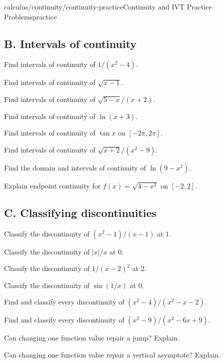 \documentclass[11pt,openany]{book}
\theoremstyle{bgplain}
\begin{document}
\begin{webpage}{calculus/continuity/continuity-practice}{Continuity and IVT Practice Problems}{practice}
\subsection*{B. Intervals of continuity}
\begin{bgexercises}[label=\textbf{5.\arabic*},resume]
  \item Find intervals of continuity of \(1/(x^2-4)\).
  \item Find intervals of continuity of \(\sqrt{x-1}\).
  \item Find intervals of continuity of \(\sqrt{5-x}/(x+2)\).
  \item Find intervals of continuity of \(\ln(x+3)\).
  \item Find intervals of continuity of \(\tan x\) on \([-2\pi,2\pi]\).
  \item Find intervals of continuity of \(\sqrt{x+2}/(x^2-9)\).
  \item Find the domain and intervals of continuity of \(\ln(9-x^2)\).
  \item Explain endpoint continuity for \(f(x)=\sqrt{4-x^2}\) on \([-2,2]\).
\end{bgexercises}

\subsection*{C. Classifying discontinuities}
\begin{bgexercises}[label=\textbf{5.\arabic*},resume]
  \item Classify the discontinuity of \((x^2-1)/(x-1)\) at \(1\).
  \item Classify the discontinuity of \(|x|/x\) at \(0\).
  \item Classify the discontinuity of \(1/(x-2)^2\) at \(2\).
  \item Classify the discontinuity of \(\sin(1/x)\) at \(0\).
  \item Find and classify every discontinuity of \((x^2-4)/(x^2-x-2)\).
  \item Find and classify every discontinuity of \((x^2-9)/(x^2-6x+9)\).
  \item Can changing one function value repair a jump? Explain.
  \item Can changing one function value repair a vertical asymptote? Explain.
\end{bgexercises}


\end{webpage}
\end{document}
